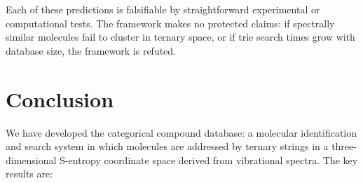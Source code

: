 \documentclass[11pt,a4paper]{article}
\theoremstyle{definition}
\theoremstyle{remark}
\begin{document}
Each of these predictions is falsifiable by straightforward experimental or computational tests. The framework makes no protected claims: if spectrally similar molecules fail to cluster in ternary space, or if trie search times grow with database size, the framework is refuted.

\section{Conclusion}
\label{sec:conclusion}

We have developed the categorical compound database: a molecular identification and search system in which molecules are addressed by ternary strings in a three-dimensional S-entropy coordinate space derived from vibrational spectra. The key results are:
\end{document}
